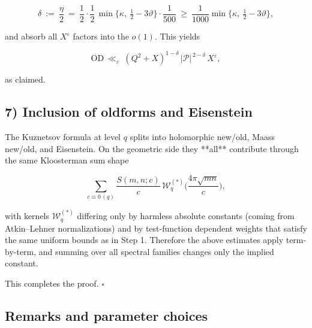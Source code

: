 \documentclass[11pt]{article}
\theoremstyle{definition}
\theoremstyle{remark}
\begin{document}
$$
\delta\ :=\ \frac{\eta}{2}\ =\ \frac12\cdot\frac12\,\min\!\Big\{\kappa,\ \tfrac12-3\vartheta\Big\}\cdot\frac{1}{500}
\ \ge\ \frac{1}{1000}\min\!\Big\{\kappa,\ \tfrac12-3\vartheta\Big\},
$$

and absorb all $X^\varepsilon$ factors into the $o(1)$. This yields

$$
\mathrm{OD}\ \ll_\varepsilon\ (Q^2+X)^{1-\delta}\,|\mathcal P|^{\,2-\delta}\,X^\varepsilon,
$$

as claimed.

\subsection*{7) Inclusion of oldforms and Eisenstein}

The Kuznetsov formula at level $q$ splits into holomorphic new/old, Maass new/old, and Eisenstein. On the geometric side they **all** contribute through the same Kloosterman sum shape

$$
\sum_{c\equiv 0\,(q)} \frac{S(m,n;c)}{c}\,\mathcal W_q^{(*)}\!\Big(\frac{4\pi\sqrt{mn}}{c}\Big),
$$

with kernels $\mathcal W_q^{(*)}$ differing only by harmless absolute constants (coming from Atkin–Lehner normalizations) and by test-function dependent weights that satisfy the same uniform bounds as in Step 1. Therefore the above estimates apply term-by-term, and summing over all spectral families changes only the implied constant.

This completes the proof. $\square$

\subsection*{Remarks and parameter choices}
\end{document}
